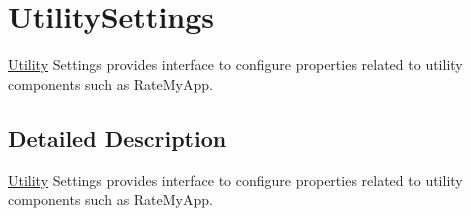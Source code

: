 \hypertarget{class_voxel_busters_1_1_native_plugins_1_1_utility_settings}{}\section{Utility\+Settings}
\label{class_voxel_busters_1_1_native_plugins_1_1_utility_settings}


\hyperlink{class_voxel_busters_1_1_native_plugins_1_1_utility}{Utility} Settings provides interface to configure properties related to utility components such as Rate\+My\+App.  




\subsection{Detailed Description}
\hyperlink{class_voxel_busters_1_1_native_plugins_1_1_utility}{Utility} Settings provides interface to configure properties related to utility components such as Rate\+My\+App. 

